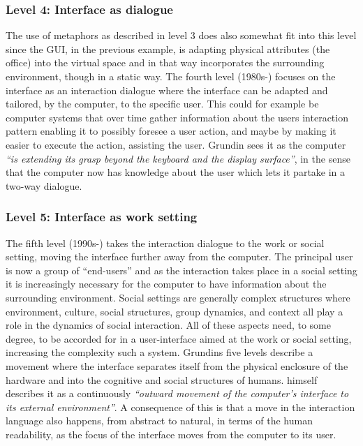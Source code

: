 \subsubsection{Level 4: Interface as dialogue}
The use of metaphors as described in level 3 does also somewhat fit into this level since the GUI, in the previous example, is adapting physical attributes (the office) into the virtual space and in that way incorporates the surrounding environment, though in a static way.
The fourth level (1980s-) focuses on the interface as an interaction dialogue where the interface can be adapted and tailored, by the computer, to the specific user.
This could for example be computer systems that over time gather information about the users interaction pattern enabling it to possibly foresee a user action, and maybe by making it easier to execute the action, assisting the user.
Grundin sees it as the computer \emph{``is extending its grasp beyond the keyboard and the display surface''}, in the sense that the computer now has knowledge about the user which lets it partake in a two-way dialogue.

\subsubsection{Level 5: Interface as work setting}
The fifth level (1990s-) takes the interaction dialogue to the work or social setting, moving the interface further away from the computer.
The principal user is now a group of ``end-users'' and as the interaction takes place in a social setting it is increasingly necessary for the computer to have information about the surrounding environment.
Social settings are generally complex structures where environment, culture, social structures, group dynamics, and context all play a role in the dynamics of social interaction.
All of these aspects need, to some degree, to be accorded for in a user-interface aimed at the work or social setting, increasing the complexity such a system.
\blank
Grundins five levels describe a movement where the interface separates itself from the physical enclosure of the hardware and into the cognitive and social structures of humans.
\citeauthor{grudin1990computer} himself describes it as a continuously \emph{``outward movement of the computer's interface to its external environment''}.
A consequence of this is that a move in the interaction language also happens, from abstract to natural, in terms of the human readability, as the focus of the interface moves from the computer to its user.

